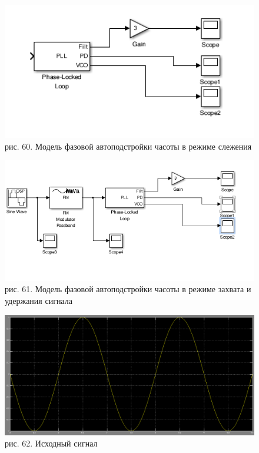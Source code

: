 \documentclass[10pt,a4paper]{report}
\begin{document}
\begin{figure}
\begin{center}
\includegraphics[width=150mm, scale = 0.9]{8_11}\newline
рис. 60. Модель фазовой автоподстройки часоты в режиме слежения\newline
\end{center}
\end{figure}
\begin{figure}
\begin{center}
\includegraphics[width=150mm, scale = 0.9]{8_12}\newline
рис. 61. Модель фазовой автоподстройки часоты в режиме захвата и удержания сигнала\newline
\end{center}
\end{figure}
\begin{figure}
\begin{center}
\includegraphics[width=150mm, scale = 0.9]{8_13}\newline
рис. 62. Исходный сигнал\newline
\end{center}
\end{figure}
\end{document}
